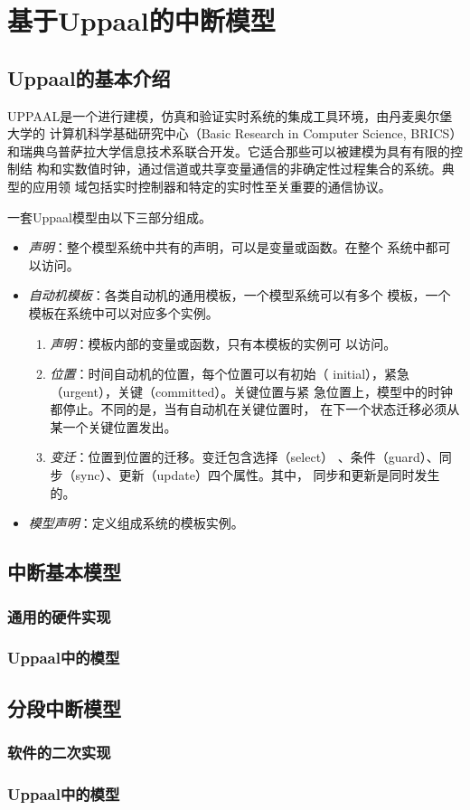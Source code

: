 
\chapter{基于Uppaal的中断模型}

\section{Uppaal的基本介绍}	
UPPAAL是一个进行建模，仿真和验证实时系统的集成工具环境，由丹麦奥尔堡大学的
计算机科学基础研究中心（Basic Research in Computer Science, BRICS）
和瑞典乌普萨拉大学信息技术系联合开发。它适合那些可以被建模为具有有限的控制结
构和实数值时钟，通过信道或共享变量通信的非确定性过程集合的系统。典型的应用领
域包括实时控制器和特定的实时性至关重要的通信协议。

一套Uppaal模型由以下三部分组成。
\begin{itemize}
	\item \emph{声明}：整个模型系统中共有的声明，可以是变量或函数。在整个
	系统中都可以访问。
	\item \emph{自动机模板}：各类自动机的通用模板，一个模型系统可以有多个
	模板，一个模板在系统中可以对应多个实例。
		\begin{enumerate}[(1)]
			\item \emph{声明}：模板内部的变量或函数，只有本模板的实例可
			以访问。
			\item \emph{位置}：时间自动机的位置，每个位置可以有初始（
			initial），紧急（urgent），关键（committed）。关键位置与紧
			急位置上，模型中的时钟都停止。不同的是，当有自动机在关键位置时，
			在下一个状态迁移必须从某一个关键位置发出。
			\item \emph{变迁}：位置到位置的迁移。变迁包含选择（select）
			、条件（guard）、同步（sync）、更新（update）四个属性。其中，
			同步和更新是同时发生的。
		\end{enumerate}	
	\item \emph{模型声明}：定义组成系统的模板实例。
\end{itemize}

\section{中断基本模型}
\subsection{通用的硬件实现}
\subsection{Uppaal中的模型}

\section{分段中断模型}
\subsection{软件的二次实现}
\subsection{Uppaal中的模型}